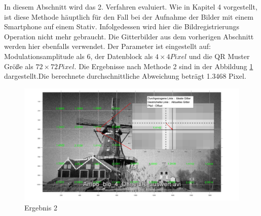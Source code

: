 In diesem Abschnitt wird das 2. Verfahren evaluiert. Wie in Kapitel 4 vorgestellt, ist diese Methode häuptlich für den Fall bei der Aufnahme der Bilder mit einem Smartphone auf einem Stativ. Infolgedessen wird hier die Bildregistrierungs Operation nicht mehr gebraucht. Die Gitterbilder aus dem vorherigen Abschnitt werden hier ebenfalls verwendet. Der Parameter ist eingestellt auf: Modulationsamplitude als 6, der Datenblock als $ 4 \times 4 Pixel$ und die QR Muster Größe als $ 72 \times 72 Pixel $. Die Ergebnisse nach Methode 2 sind in der Abbildung \ref{fig:Ergebnis2} dargestellt.Die berechnete durchschnittliche Abweichung beträgt 1.3468 Pixel. 
\begin{figure}[H]
 \centering 
  \includegraphics[keepaspectratio,width=1.00\textwidth]{images/6_Auswertung/Ergebnis2.pdf}
 \caption{Ergebnis 2}
 \label{fig:Ergebnis2}
\end{figure}